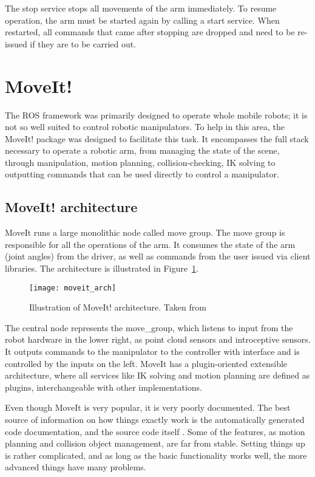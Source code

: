 \documentclass[buriama8_dp.tex]{subfiles}
\begin{document}
The stop service stops all movements of the arm immediately. To resume operation, the arm must be started again by calling a start service. When restarted, all commands that came after stopping are dropped and need to be re-issued if they are to be carried out.

\section{MoveIt!}
\label{sec:moveit}

The ROS framework was primarily designed to operate whole mobile robots; it is not so well suited to control robotic manipulators. To help in this area, the MoveIt! package \cite{moveit_docs} was designed to facilitate this task. It encompasses the full stack necessary to operate a robotic arm, from managing the state of the scene, through manipulation, motion planning, collision-checking, IK solving to outputting commands that can be used directly to control a manipulator.

\subsection{MoveIt! architecture}
\label{subsec:mvt_arch}

MoveIt runs a large monolithic node called move group. The move group is responsible for all the operations of the arm. It consumes the state of the arm (joint angles) from the driver, as well as commands from the user issued via client libraries. The architecture is illustrated in Figure~\ref{fig:moveit_arch}.

\begin{figure}[ht]
  \centering
  \texttt{[image: moveit\_arch]}
  \caption[MoveIt! architecture]{Illustration of MoveIt! architecture. Taken from \cite{moveit_docs}}
  \label{fig:moveit_arch}
\end{figure}

The central node represents the move\_group, which listens to input from the robot hardware in the lower right, as point cloud sensors and introceptive sensors. It outputs commands to the manipulator to the controller with  interface and is controlled by the inputs on the left. MoveIt has a plugin-oriented extensible architecture, where all services like IK solving and motion planning are defined as plugins, interchangeable with other implementations.

Even though MoveIt is very popular, it is very poorly documented. The best source of information on how things exactly work is the automatically generated code documentation, and the source code itself \cite{moveit_src}. Some of the features, as motion planning and collision object management, are far from stable. Setting things up is rather complicated, and as long as the basic functionality works well, the more advanced things have many problems.
\end{document}
